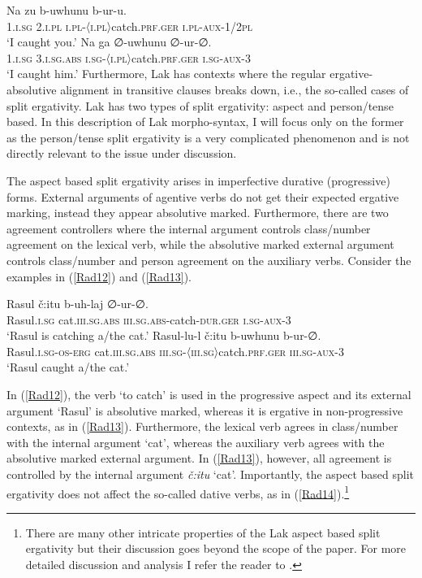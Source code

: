 \documentclass[output=paper]{langscibook}
\begin{document}
\ea\label{Rad10}
\gll Na zu b-uwhunu b-ur-u.\\
\textsc{1.i.sg}  \textsc{2.i.pl} \textsc{i.pl-〈i.pl〉}catch.\textsc{prf.ger} \textsc{i.pl-aux-1/2pl}\\
\glt ‘I caught you.’
\ex\label{Rad11}
\gll Na ga ∅-uwhunu ∅-ur-∅.\\
\textsc{1.i.sg}	\textsc{3.i.sg.abs} \textsc{i.sg-〈i.pl〉}catch.\textsc{prf.ger} \textsc{i.sg-aux-3}\\
\glt ‘I caught him.’
\z
Furthermore, Lak has contexts where the regular ergative-absolutive alignment in transitive clauses breaks down, i.e., the so-called cases of split ergativity. Lak has two types of split ergativity: aspect and person/tense based. In this description of Lak morpho-syntax, I will focus only on the former as the person/tense split ergativity is a very complicated phenomenon and is not directly relevant to the issue under discussion.

The aspect based split ergativity arises in imperfective durative (progressive) forms. External arguments of agentive verbs do not get their expected ergative marking, instead they appear absolutive marked. Furthermore, there are two agreement controllers where the internal argument controls class/number agreement on the lexical verb, while the absolutive marked external argument controls class/number and person agreement on the auxiliary verbs. Consider the examples in (\ref{Rad12}) and (\ref{Rad13}).

\ea\label{Rad12}
\gll Rasul č:itu b-uh-laj ∅-ur-∅.\\
Rasul.\textsc{i.sg} cat.\textsc{iii.sg.abs} \textsc{iii.sg.abs}-catch-\textsc{dur.ger} \textsc{i.sg-aux-3}\\
\glt ‘Rasul is catching a/the cat.’
\ex\label{Rad13}
\gll Rasul-lu-l č:itu b-uwhunu b-ur-∅.\\
Rasul.\textsc{i.sg-os-erg} cat.\textsc{iii.sg.abs} \textsc{iii.sg-〈iii.sg〉}catch.\textsc{prf.ger} \textsc{iii.sg-aux-3}\\
\glt ‘Rasul caught a/the cat.’
\z

In (\ref{Rad12}), the verb ‘to catch’ is used in the progressive aspect and its external argument ‘Rasul’ is absolutive marked, whereas it is ergative in non-progressive contexts, as in (\ref{Rad13}). Furthermore, the lexical verb agrees in class/number with the internal argument ‘cat’, whereas the auxiliary verb agrees with the absolutive marked external argument. In (\ref{Rad13}), however, all agreement is controlled by the internal argument \textit{č:itu} ‘cat’. Importantly, the aspect based split ergativity does not affect the so-called dative verbs, as in (\ref{Rad14}).\footnote{There are many other intricate properties of the Lak aspect based split ergativity but their discussion goes beyond the scope of the paper. For more detailed discussion and analysis I refer the reader to \citet{GagliardiRadkevich2014}.} 
\end{document}
